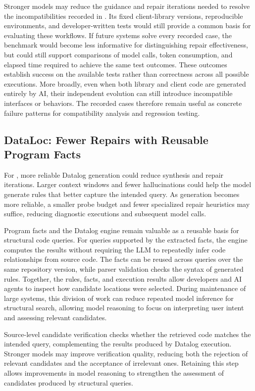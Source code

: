 Stronger models may reduce the guidance and repair iterations needed to resolve the incompatibilities recorded in \toolcompsuite. Its fixed client-library versions, reproducible environments, and developer-written tests would still provide a common basis for evaluating these workflows. If future systems solve every recorded case, the benchmark would become less informative for distinguishing repair effectiveness, but could still support comparisons of model calls, token consumption, and elapsed time required to achieve the same test outcomes. These outcomes establish success on the available tests rather than correctness across all possible executions. More broadly, even when both library and client code are generated entirely by AI, their independent evolution can still introduce incompatible interfaces or behaviors. The recorded cases therefore remain useful as concrete failure patterns for compatibility analysis and regression testing.

\subsection{DataLoc: Fewer Repairs with Reusable Program Facts}
For \tooldataloc, more reliable Datalog generation could reduce synthesis and repair iterations. Larger context windows and fewer hallucinations could help the model generate rules that better capture the intended query. As generation becomes more reliable, a smaller probe budget and fewer specialized repair heuristics may suffice, reducing diagnostic executions and subsequent model calls.

Program facts and the Datalog engine remain valuable as a reusable basis for structural code queries. For queries supported by the extracted facts, the engine computes the results without requiring the LLM to repeatedly infer code relationships from source code. The facts can be reused across queries over the same repository version, while parser validation checks the syntax of generated rules. Together, the rules, facts, and execution results allow developers and AI agents to inspect how candidate locations were selected. During maintenance of large systems, this division of work can reduce repeated model inference for structural search, allowing model reasoning to focus on interpreting user intent and assessing relevant candidates.

Source-level candidate verification checks whether the retrieved code matches the intended query, complementing the results produced by Datalog execution. Stronger models may improve verification quality, reducing both the rejection of relevant candidates and the acceptance of irrelevant ones. Retaining this step allows improvements in model reasoning to strengthen the assessment of candidates produced by structural queries.

